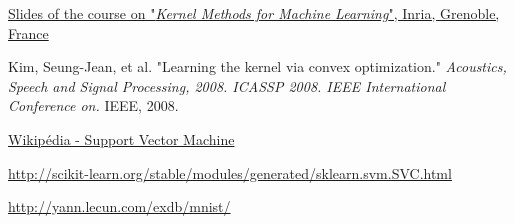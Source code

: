 \documentclass[a4paper, 11pt]{article}
\begin{document}
\begin{thebibliography}{1}

 \href{http://lear.inrialpes.fr/people/mairal/teaching/2015-2016/MVA/fichiers/mva_slides.pdf}{Slides of the course on "{\it Kernel Methods for Machine Learning}", Inria, Grenoble, France}

 Kim, Seung-Jean, et al. "Learning the kernel via convex optimization." {\it Acoustics, Speech and Signal Processing, 2008. ICASSP 2008. IEEE International Conference on.} IEEE, 2008.

 \href{https://en.wikipedia.org/wiki/Support_vector_machine}{Wikip\'edia - Support Vector Machine}

 \href{Library {\it sklearn} for Machine Learning in Python. Functions on SVM/SVC.}{http://scikit-learn.org/stable/modules/generated/sklearn.svm.SVC.html}

 \href{The MNIST Databse of handwritten digits. (Website of Yann Lecun)}{http://yann.lecun.com/exdb/mnist/}

\end{thebibliography}
\end{document}
